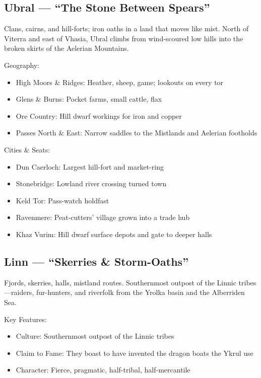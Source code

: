 \subsection{Ubral --- ``The Stone Between Spears''}
\label{sec:ubral}

Clans, cairns, and hill-forts; iron oaths in a land that moves like mist. North of Viterra and east of Vhasia, Ubral climbs from wind-scoured low hills into the broken skirts of the Aelerian Mountains.

Geography:
\begin{itemize}
    \item High Moors \& Ridges: Heather, sheep, game; lookouts on every tor
    \item Glens \& Burns: Pocket farms, small cattle, flax
    \item Ore Country: Hill dwarf workings for iron and copper
    \item Passes North \& East: Narrow saddles to the Mistlands and Aelerian footholds
\end{itemize}

Cities \& Seats:
\begin{itemize}
    \item Dun Caerloch: Largest hill-fort and market-ring
    \item Stonebridge: Lowland river crossing turned town
    \item Keld Tor: Pass-watch holdfast
    \item Ravenmere: Peat-cutters' village grown into a trade hub
    \item Khaz Vurim: Hill dwarf surface depots and gate to deeper halls
\end{itemize}

\subsection{Linn --- ``Skerries \& Storm-Oaths''}
\label{sec:linn}

Fjords, skerries, halls, mistland routes. Southernmost outpost of the Linnic tribes---raiders, fur-hunters, and riverfolk from the Yrolka basin and the Alberriden Sea.

Key Features:
\begin{itemize}
    \item Culture: Southernmost outpost of the Linnic tribes
    \item Claim to Fame: They boast to have invented the dragon boats the Ykrul use
    \item Character: Fierce, pragmatic, half-tribal, half-mercantile
\end{itemize}

